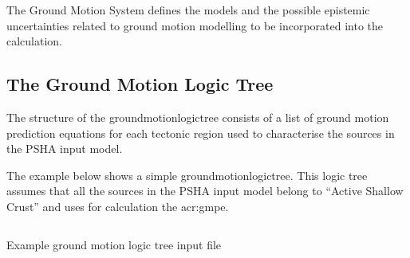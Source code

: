 The Ground Motion System defines the models and the possible epistemic
uncertainties related to ground motion modelling to be incorporated into the
calculation.

\subsection{The Ground Motion Logic Tree}
\label{subsec:gmlt}

The structure of the \gls{groundmotionlogictree} consists of a list of ground
motion prediction equations for each tectonic region used to characterise the
sources in the PSHA input model.

The example below shows a simple \gls{groundmotionlogictree}. This logic tree
assumes that all the sources in the PSHA input model belong to ``Active
Shallow Crust'' and uses for calculation the \citet{chiou2008}
\gls{acr:gmpe}.

\begin{listing}[htbp]
  \inputminted[firstline=1,firstnumber=1,fontsize=\footnotesize,frame=single,linenos,bgcolor=lightgray]{xml}{oqum/hazard/verbatim/input_gmlt.xml}
  \caption{Example ground motion logic tree input file}
  \label{lst:input_gmlt}
\end{listing}